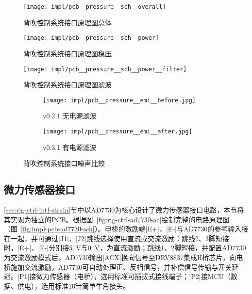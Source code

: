 \begin{figure}[hbp]
\centering
\texttt{[image: impl/pcb\_\_pressure\_\_sch\_\_overall]}
\caption{背吹控制系统接口\csep 原理图\csep 总体}
\label{fig:impl-pcb-pressure-sch-overall}
\end{figure}

\begin{figure}[hbp]
\centering
\texttt{[image: impl/pcb\_\_pressure\_\_sch\_\_power]}
\caption{背吹控制系统接口\csep 原理图\csep 稳压}
\label{fig:impl-pcb-pressure-sch-power}
\end{figure}

\begin{figure}[p]
\centering
\texttt{[image: impl/pcb\_\_pressure\_\_sch\_\_power\_\_filter]}
\caption{背吹控制系统接口\csep 原理图\csep 滤波}
\label{fig:impl-pcb-pressure-sch-power-filter}
\end{figure}

\begin{figure}[p]
  \centering
  \begin{subfigure}{1\textwidth}
    \centering
    \texttt{[image: impl/pcb\_\_pressure\_\_emi\_\_before.jpg]}
    \caption{v0.2.1 无电源滤波}
    \label{fig:impl-pcb-pressure-emi-before}
  \end{subfigure}
  \par\bigskip
  \begin{subfigure}{1\textwidth}
    \centering
    \texttt{[image: impl/pcb\_\_pressure\_\_emi\_\_after.jpg]}
    \caption{v0.3.1 有电源滤波}
    \label{fig:impl-pcb-pressure-emi-after}
  \end{subfigure}
\caption{背吹控制系统接口\csep 噪声比较}
\label{fig:impl-pcb-pressure-emi}
\end{figure}



\clearpage


\subsection{微力传感器接口}\label{sec:impl-pcb-ad7730}

\ref{sec:rig-ctrl-intf-strain}节中以AD7730为核心设计了微力传感器接口电路，本节将其实现为独立的PCB。根据图~\ref{fig:rig-ctrl-ad7730-ac}绘制完整的电路原理图（图~\ref{fig:impl-pcb-ad7730-sch}）。电桥的激励端\bverb|E+|、\bverb|E-|与AD7730的参考输入接在一起，并可通过\bverb|J1|、\bverb|J2|跳线选择使用直流或交流激励：跳线2、3脚短接时，\bverb|E+|、\bverb|E-|分别接\SI{+5}{\V}与\SI{0}{\V}，为直流激励；跳线1、2脚短接，并配置AD7730为交流激励模式后，AD7730输出\bverb|ACX|换向信号至DRV8837集成H桥芯片，向电桥施加交流激励，AD7730可自动处理正、反相信号，并补偿信号传输与开关延迟。\bverb|P1|接微力传感器（电桥），选用标准可插拔式接线端子；\bverb|P2|接MCU（数据、供电），选用标准10针简单牛角接头。

